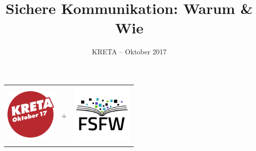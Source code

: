 \documentclass{beamer}
\title{Sichere Kommunikation: Warum \& Wie}
\subtitle{KRETA – Oktober 2017}
\begin{document}
\begin{frame}
  \begin{center}%
    \begin{tabularx}{7cm}{XcX}
      \includegraphics[width=2.5cm]{img-src/kreta-logo.png}
      &+&
      \includegraphics[width=3cm]{img-src/fsfw-logo-with-text.pdf}
    \end{tabularx}
    
    \vspace*{2\baselineskip}

    \parbox{.95\columnwidth}{\centering\Large\inserttitle}

    \vspace*{\baselineskip}

    \structure{\large \insertsubtitle}
  \end{center}
\end{frame}


\end{document}

